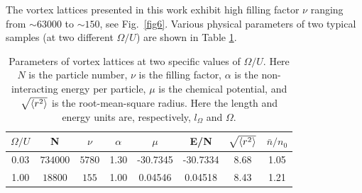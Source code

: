 \documentclass[reprint,aps,pra,twocolumn,superscriptaddress]{revtex4-1}
\begin{document}
The vortex lattices presented in this work exhibit high filling factor $\nu$ ranging from $\sim 63000$ to $\sim150$, see Fig.~\ref{fig6}. Various physical parameters of two typical samples (at two different $\Omega/U$) are shown in Table \ref{table}.


\begin{table}[H]
    \centering
    \begin{tabular}{ c |c |c |c| c| c| c| c }
        $\Omega/U$ & N & $\nu$ & $\alpha$ & $\mu$ & E/N & $\sqrt{\braket{r^2}}$ & $\bar{n}/n_0$ \\ 
        \hline
        0.03 & $734000$ & $5780$ & 1.30 & -30.7345 & -30.7334 & 8.68 & 1.05 \\
        1.00 &  $18800$ & $155$ & 1.00 & 0.04546 & 0.04518 & 8.43 & 1.21  
    \end{tabular}
    \caption{Parameters of vortex lattices at two specific values of $\Omega/U$. Here $N$ is the particle number, $\nu$ is the filling factor, $\alpha$ is the non-interacting energy per particle, $\mu$ is the chemical potential, and $\sqrt{\braket{r^2}}$ is the root-mean-square radius. Here the length and energy units are, respectively, $l_{\Omega}$ and $\Omega$. } \label{table}
\end{table}
\end{document}
